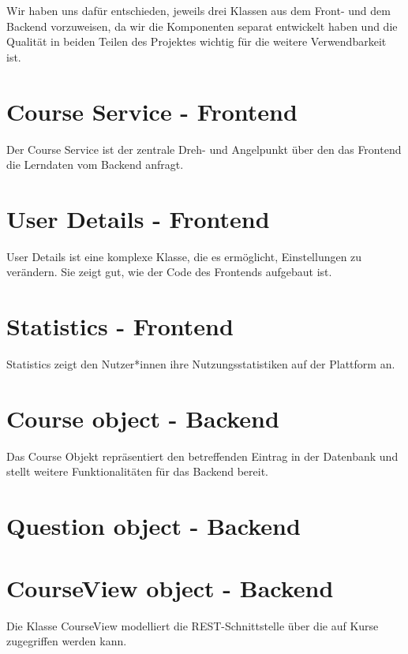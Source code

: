 \documentclass[accentcolor=tud0b,12pt,paper=a4]{tudreport}
\begin{document}
	Wir haben uns dafür entschieden, jeweils drei Klassen aus dem Front- und dem Backend vorzuweisen, da wir die Komponenten separat entwickelt haben und die Qualität in beiden Teilen des Projektes wichtig für die weitere Verwendbarkeit ist.

	\section*{Course Service - Frontend}
	Der Course Service ist der zentrale Dreh- und Angelpunkt über den das Frontend die Lerndaten vom Backend anfragt.

	

	\section*{User Details - Frontend}
	User Details ist eine komplexe Klasse, die es ermöglicht, Einstellungen zu verändern. Sie zeigt gut, wie der Code des Frontends aufgebaut ist.

	

	\section*{Statistics - Frontend}
	Statistics zeigt den Nutzer*innen ihre Nutzungsstatistiken auf der Plattform an. 

	

	\section*{Course object - Backend}
	Das Course Objekt repräsentiert den betreffenden Eintrag in der Datenbank und stellt weitere Funktionalitäten für das Backend bereit.

	

	\section*{Question object - Backend} 

	

	\section*{CourseView object - Backend}
	Die Klasse CourseView modelliert die REST-Schnittstelle über die auf Kurse zugegriffen werden kann.
\end{document}
